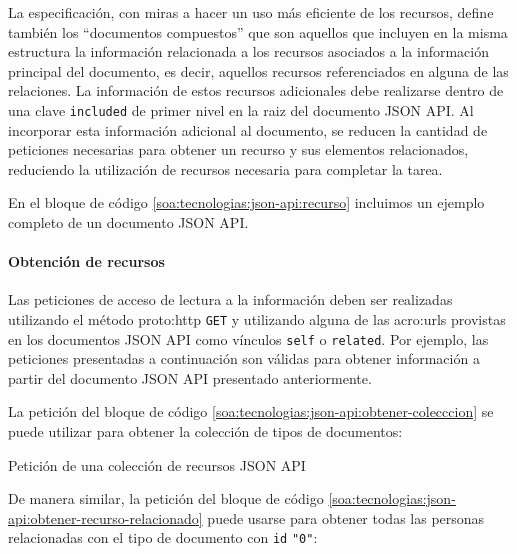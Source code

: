 La especificación, con miras a hacer un uso más eficiente de los recursos, define también los ``documentos compuestos'' que son aquellos que incluyen en la misma estructura la información relacionada a los recursos asociados a la información principal del documento, es decir, aquellos recursos referenciados en alguna de las relaciones. La información de estos recursos adicionales debe realizarse dentro de una clave \texttt{included} de primer nivel en la raiz del documento JSON API. Al incorporar esta información adicional al documento, se reducen la cantidad de peticiones necesarias para obtener un recurso y sus elementos relacionados, reduciendo la utilización de recursos necesaria para completar la tarea.

En el bloque de código \autoref{soa:tecnologias:json-api:recurso} incluimos un ejemplo completo de un documento JSON API.

\begingroup
\endgroup

\paragraph{Obtención de recursos}

Las peticiones de acceso de lectura a la información deben ser realizadas utilizando el método \gls{proto:http} \texttt{GET} y utilizando alguna de las \glspl{acro:url} provistas en los documentos JSON API como vínculos \texttt{self} o \texttt{related}. Por ejemplo, las peticiones presentadas a continuación son válidas para obtener información a partir del documento JSON API presentado anteriormente.

La petición del bloque de código \autoref{soa:tecnologias:json-api:obtener-colecccion} se puede utilizar para obtener la colección de tipos de documentos:

\begin{listing}[H]
  \caption{Petición de una colección de recursos JSON API}
  \label{soa:tecnologias:json-api:obtener-colecccion}
\end{listing}

De manera similar, la petición del bloque de código \autoref{soa:tecnologias:json-api:obtener-recurso-relacionado} puede usarse para obtener todas las personas relacionadas con el tipo de documento con \texttt{id} \texttt{"0"}:


